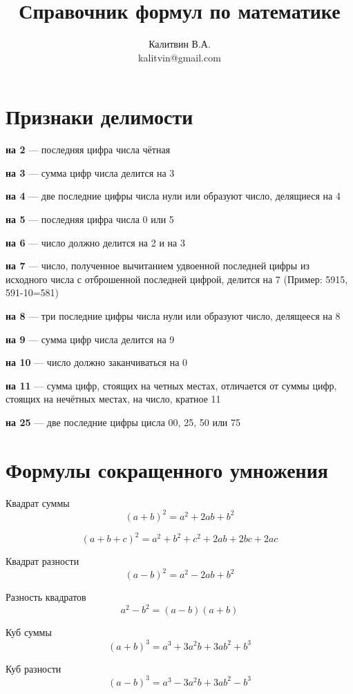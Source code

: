 \documentclass[a5paper, 8pt]{extarticle}
\begin{document}
\author{Калитвин В.А.\\
kalitvin@gmail.com}
\title{Справочник формул по математике}
\maketitle
\thispagestyle{empty}
\newpage

\section{Признаки делимости}

\textbf{на 2} --- последняя цифра числа чётная

\textbf{на 3} --- сумма цифр числа делится на 3

\textbf{на 4} --- две последние цифры числа нули или образуют число, делящиеся на 4

\textbf{на 5} --- последняя цифра числа 0 или 5

\textbf{на 6} --- число должно делится на 2 и на 3

\textbf{на 7} --- число, полученное вычитанием удвоенной последней цифры из исходного числа с отброшенной последней цифрой, делится на 7 (Пример: 5915, 591-10=581)

\textbf{на 8} --- три последние цифры числа нули или образуют число, делящееся на 8

\textbf{на 9} --- сумма цифр числа делится на 9 

\textbf{на 10} --- число должно заканчиваться на 0

\textbf{на 11} --- сумма цифр, стоящих на четных местах, отличается от суммы цифр, стоящих на нечётных местах, на число, кратное 11

\textbf{на 25} --- две последние цифры цисла 00, 25, 50 или 75


\section{Формулы сокращенного умножения}

Квадрат суммы
$$ (a+b)^2=a^2+2ab+b^2$$

$$ (a+b+c)^2=a^2+b^2+c^2+2ab+2bc+2ac$$

Квадрат разности
$$(a-b)^2=a^2-2ab+b^2$$

Разность квадратов
$$a^2-b^2=(a-b)(a+b)$$

Куб суммы
$$(a+b)^3=a^3+3a^2b+3ab^2+b^3$$

Куб разности
$$(a-b)^3=a^3-3a^2b+3ab^2-b^3$$
\end{document}
